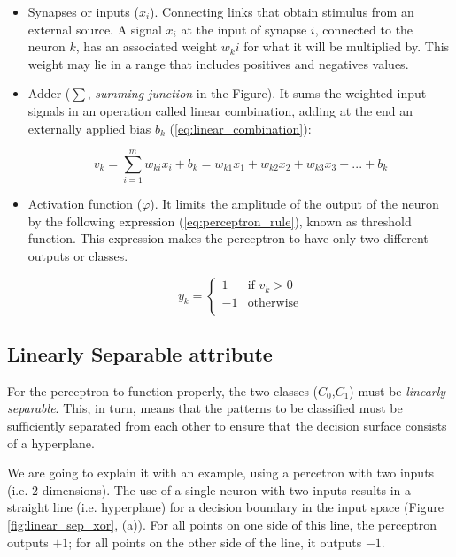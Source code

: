 \begin{itemize}
	\item Synapses or inputs ($x_i$). Connecting links that obtain stimulus from an external source. A signal $x_i$ at the input of synapse $i$, connected to the neuron $k$, has an associated weight $w_ki$ for what it will be multiplied by. This weight may lie in a range that includes positives and negatives values.

	\item Adder ($\sum$, \textit{summing junction} in the Figure). It sums the weighted input signals in an operation called linear combination, adding at the end an externally applied bias $b_k$ (\ref{eq:linear_combination}):

	\begin{equation}
	    \label{eq:linear_combination}
	        v_k=\sum_{i=1}^{m} w_{ki} x_i + b_k = w_{k1} x_1 + w_{k2} x_2 + w_{k3} x_3 + ... + b_k%
	\end{equation}

	\item Activation function ($\varphi$). It limits the amplitude of the output of the neuron by the following expression (\ref{eq:perceptron_rule}), known as threshold function. This expression makes the perceptron to have only two different outputs or classes. 

	\begin{equation}
	    \label{eq:perceptron_rule}
			y_k =
				\begin{cases}
			     	1 & \text{if } v_k > 0 \\
			        -1 & \text{otherwise} \\
				\end{cases}
		\end{equation}
	\end{itemize}

	\subsection{Linearly Separable attribute}
	For the perceptron to function properly, the two classes ($C_0$,$C_1$) must be \textit{linearly separable}. This, in turn, means that the patterns to be classified must be sufficiently separated from each other to ensure that the decision surface consists of a hyperplane.

	We are going to explain it with an example, using a percetron with two inputs (i.e. 2 dimensions). The use of a single neuron with two inputs results in a straight line (i.e. hyperplane) for a decision boundary in the input space (Figure \ref{fig:linear_sep_xor}, (a)). For all points on one side of this line, the perceptron outputs $+1$; for all points on the other side of the line, it outputs $-1$.

